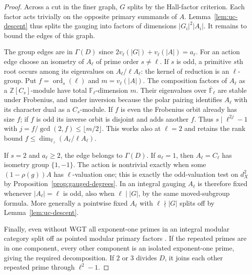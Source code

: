 \documentclass[11pt,a4paper]{article}
\numberwithin{equation}{section}
\theoremstyle{remark}
\begin{document}
\begin{proof}
Across a cut in the finer graph, $G$ splits by the Hall-factor
criterion. Each factor acts trivially on the opposite primary
summands of $A$. Lemma~\ref{lem:uc-descent} thus splits the
gauging into factors of dimensions $|G_i|^2|A_i|$.
It remains to bound the edges of this graph.

The group edges are in $\Gamma(D)$ since
$2v_\ell(|G|)+v_\ell(|A|)=a_\ell$. For an action edge choose an
isometry of $A_\ell$ of prime order $s\ne\ell$. If $s$ is odd,
a primitive $s$th root occurs among its eigenvalues on
$A_\ell/\ell A_\ell$: the kernel of reduction is an $\ell$-group.
Put $f=\operatorname{ord}_s(\ell)$ and $m=v_\ell(|A|)$.
The composition factors of $A_\ell$ as a $\mathbb Z[C_s]$-module have total
$\mathbb F_\ell$-dimension $m$. Their eigenvalues over
$\overline{\mathbb F}_\ell$ are stable under Frobenius, and under
inversion because the polar pairing identifies $A_\ell$ with its
character dual as a $C_s$-module. If $f$ is even the Frobenius
orbit already has size $f$; if $f$ is odd its inverse orbit is
disjoint and adds another $f$. Thus $s\mid\ell^{2j}-1$ with
$j=f/\gcd(2,f)\le\lfloor m/2\rfloor$. This works also at
$\ell=2$ and retains the rank bound
$f\le\dim_{\mathbb F_\ell}(A_\ell/\ell A_\ell)$.

If $s=2$ and $a_\ell\ge2$, the edge belongs to $\Gamma(D)$.
If $a_\ell=1$, then $A_\ell=C_\ell$ has isometry group
$\{1,-1\}$. The action is nontrivial exactly when some
$(1-\rho(g))A$ has $\ell$-valuation one; this is exactly the
odd-valuation test on $d_X^2$ by Proposition~\ref{prop:gauged-degrees}.
In an integral gauging $A_\ell$ is therefore fixed whenever
$|A_\ell|=\ell$ is odd, also when $\ell\mid |G|$, by the same
moved-subgroup formula.
More generally a pointwise fixed $A_\ell$ with $\ell\nmid|G|$
splits off by Lemma~\ref{lem:uc-descent}.

Finally, even without WGT all exponent-one primes in an integral
modular category split off as pointed modular primary factors
\cite[Corollary~1.22]{BP}. If the repeated primes are in one
component, every other component is an isolated exponent-one prime,
giving the required decomposition. If $2$ or $3$ divides $D$, it
joins each other repeated prime through $\ell^2-1$.
\end{proof}
\end{document}
